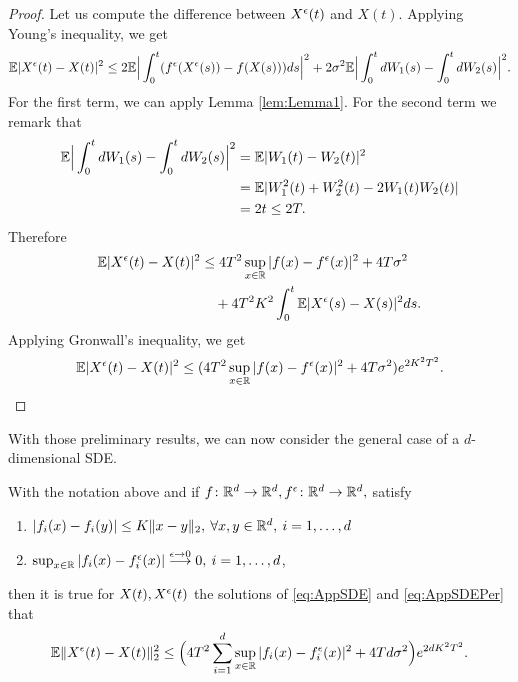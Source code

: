 \begin{proof} Let us compute the difference between $X^\epsilon(t)$ and $X(t)$. Applying Young's inequality, we get
\begin{equation*}
	\mathbb{E} |X^\epsilon(t) - X(t)|^2 \leq 2\mathbb{E} \Big|\int_0^t (f^\epsilon (X^\epsilon(s)) - f(X(s)))ds \Big|^2 + 2\sigma^2 \mathbb{E} \Big|\int_0^t dW_1(s) - \int_0^t dW_2(s)  \Big|^2.
\end{equation*}
For the first term, we can apply Lemma \ref{lem:Lemma1}. For the second term we remark that
\begin{equation*}
\begin{aligned}
	\mathbb{E} \Big|\int_0^t dW_1(s) - \int_0^t dW_2(s)  \Big|^2 &= \mathbb{E} | W_1(t) - W_2(t) |^2 \\
		&= \mathbb{E} | W_1^2(t) + W_2^2(t) - 2W_1(t)W_2(t) | \\
		&= 2t \leq 2T.
\end{aligned}
\end{equation*}
Therefore
\begin{equation*}
\begin{aligned}
	\mathbb{E} |X^\epsilon(t) - X(t)|^2 &\leq 4T^2 \sup_{x\in \mathbb{R}}|f(x) - f^\epsilon(x)|^2 + 4T\sigma^2 \\
	&\quad + 4T^2K^2 \int_0^t \mathbb{E}|X^\epsilon(s) - X(s)|^2ds.
\end{aligned}
\end{equation*}
Applying Gronwall's inequality, we get
\begin{equation*}	
	\mathbb{E} |X^\epsilon(t) - X(t)|^2 \leq (4T^2 \sup_{x\in \mathbb{R}}|f(x) - f^\epsilon(x)|^2 + 4T\sigma^2) e^{2K^2T^2}.
\end{equation*}
\end{proof}
\noindent With those preliminary results, we can now consider the general case of a $d$-dimensional SDE.
\begin{theorem}\label{th:Prop} With the notation above and if $f\colon \mathbb{R}^d \rightarrow \mathbb{R}^d, f^\epsilon\colon \mathbb{R}^d \rightarrow \mathbb{R}^d,$ satisfy
\begin{enumerate}
	\item $|f_i(x) - f_i(y)| \leq K\|x - y\|_2, \: \forall x,y \in \mathbb{R}^d, \: i = 1, \dots, d$
 	\item $\sup_{x\in \mathbb{R}}|f_i(x) - f_i^\epsilon(x)| \stackrel{\epsilon \rightarrow 0}\longrightarrow 0, \: i = 1, \dots, d$,
\end{enumerate}
then it is true for $X(t), X^\epsilon(t)$ the solutions of \eqref{eq:AppSDE} and \eqref{eq:AppSDEPer} that 
\begin{equation}\label{eq:Proposition}
	\mathbb{E} \| X^\epsilon(t) - X(t) \|_2^2 \leq \Big(4T^2 \sum_{i=1}^d \sup_{x\in \mathbb{R}}|f_i(x) - f_i^\epsilon(x)|^2 + 4Td\sigma^2\Big)e^{2dK^2T^2}.
\end{equation}
\end{theorem}
